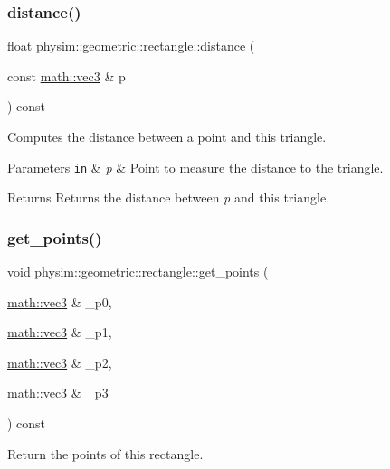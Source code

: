 \subsubsection{\texorpdfstring{distance()}{distance()}}
{\footnotesize\ttfamily float physim\+::geometric\+::rectangle\+::distance (\begin{DoxyParamCaption}\item[{const \hyperlink{structphysim_1_1math_1_1vec3}{math\+::vec3} \&}]{p }\end{DoxyParamCaption}) const}



Computes the distance between a point and this triangle. 


\begin{DoxyParams}[1]{Parameters}
\mbox{\tt in}  & {\em p} & Point to measure the distance to the triangle. \\
\hline
\end{DoxyParams}
\begin{DoxyReturn}{Returns}
Returns the distance between {\itshape p} and this triangle. 
\end{DoxyReturn}
\mbox{\label{classphysim_1_1geometric_1_1rectangle_a0d5e49e945a8c1a822f7c6c223ce657b}} 
\subsubsection{\texorpdfstring{get\+\_\+points()}{get\_points()}}
{\footnotesize\ttfamily void physim\+::geometric\+::rectangle\+::get\+\_\+points (\begin{DoxyParamCaption}\item[{\hyperlink{structphysim_1_1math_1_1vec3}{math\+::vec3} \&}]{\+\_\+p0,  }\item[{\hyperlink{structphysim_1_1math_1_1vec3}{math\+::vec3} \&}]{\+\_\+p1,  }\item[{\hyperlink{structphysim_1_1math_1_1vec3}{math\+::vec3} \&}]{\+\_\+p2,  }\item[{\hyperlink{structphysim_1_1math_1_1vec3}{math\+::vec3} \&}]{\+\_\+p3 }\end{DoxyParamCaption}) const}



Return the points of this rectangle. 


